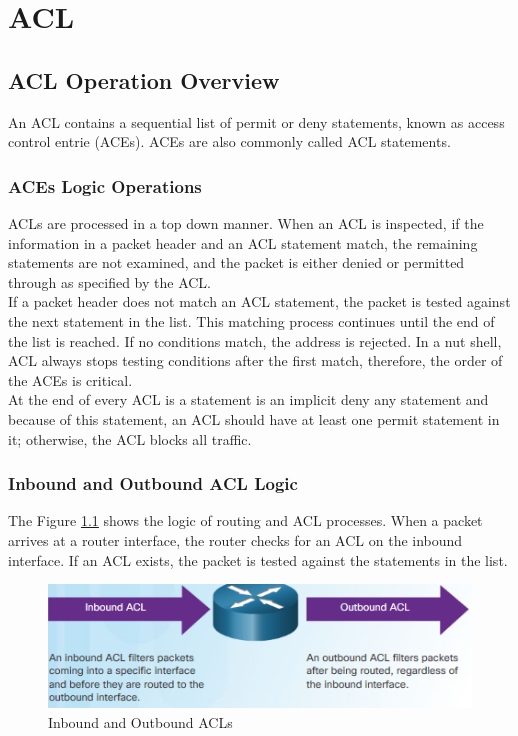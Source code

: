 \chapter{ACL}

\section{ACL Operation Overview}

An ACL contains a sequential list of permit or deny statements, known as access control entrie (ACEs). ACEs are also commonly called ACL statements. 

\subsection{ACEs Logic Operations}

ACLs are processed in a top down manner. When an ACL is inspected, if the information in a packet header and an ACL statement match, the remaining statements are not examined, and the packet is either denied or permitted through as specified by the ACL. \\

If a packet header does not match an ACL statement, the packet is tested against the next statement in the list. This matching process continues until the end of the list is reached. If no conditions match, the address is rejected. In a nut shell, ACL always stops testing conditions after the first match, therefore, the order of the ACEs is critical. \\

At the end of every ACL is a statement is an implicit deny any statement and because of this statement, an ACL should have at least one permit statement in it; otherwise, the ACL blocks all traffic.

\subsection{Inbound and Outbound ACL Logic}

The Figure \ref{InOut} shows the logic of routing and ACL processes. When a packet arrives at a router interface, the router checks for an ACL on the inbound interface. If an ACL exists, the packet is tested against the statements in the list. \\

\begin{figure}[hbtp]
\caption{Inbound and Outbound ACLs}\label{InOut}
\centering
\includegraphics[scale=1]{pictures/InOut.PNG}
\end{figure}

